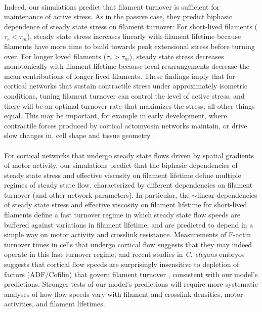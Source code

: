 \documentclass[10pt,letterpaper]{article}
\begin{document}
\paragraph{} Indeed, our simulations predict that filament turnover is sufficient for maintenance of active stress. As in the passive case, they predict biphasic dependence of steady state stress on filament turnover: For short-lived filaments ($\tau_r < \tau_m$), steady state stress increases linearly with filament lifetime because filaments have more time to build towards peak extensional stress before turning over.  For longer loved filaments ($\tau_r > \tau_m$), steady state stress decreases monotonically with filament lifetime because local rearrangements decrease the mean contributions of longer lived filaments. These findings imply that for cortical networks that sustain contractile stress under approximately isometric conditions, tuning filament turnover can control the level of active stress, and there will be an optimal turnover rate that maximizes the stress, all other things equal.  This may be important, for example in early development, where contractile forces produced by cortical actomyosin networks maintain, or drive slow changes in, cell shape and tissue geometry \cite{Salbreux2012536,Gorfinkiel2011531}.


\paragraph{} For cortical networks that undergo steady state flows driven by spatial gradients of motor activity, our simulations predict that the biphasic dependencies of steady state stress and effective viscosity on filament lifetime define multiple regimes of steady state flow, characterized by different dependencies on filament turnover (and other network parameters).  In particular, the $\sim$linear dependencies of steady state stress and effective viscosity on filament lifetime for short-lived filaments define a fast turnover regime in which steady state flow speeds are buffered against variations in filament lifetime, and are predicted to depend in a simple way on motor activity and crosslink resistance.  Measurements of F-actin turnover times in cells that undergo cortical flow \cite{Theriot1991,Murthy2016,Watanabe1083,Guha2016,Fritzsche15032013,Robin:2014aa} suggests that they may indeed operate in this fast turnover regime, and recent studies in {\em C. elegans} embryos suggests that cortical flow speeds are surprisingly insensitive to depletion of factors (ADF/Cofilin) that govern filament turnover \cite{cellmech_flows}, consistent with our model's predictions. Stronger tests of our model's predictions will require more systematic analyses of how flow speeds vary with filament and crosslink densities, motor activities, and filament lifetimes.
\end{document}
